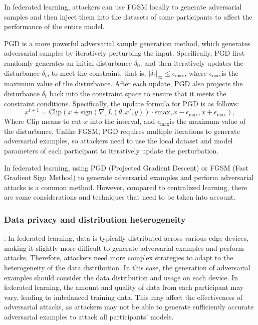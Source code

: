 \documentclass[conference]{IEEEtran}
\begin{document}
In federated learning, attackers can use FGSM locally to generate
adversarial samples and then inject them into the datasets of some participants
to affect the performance of the entire model.

PGD\cite{b100} is a more powerful adversarial sample generation method,
which generates adversarial samples by iteratively perturbing the input.
Specifically, PGD first randomly generates an initial disturbance $\delta_0$,
and then iteratively updates the disturbance $\delta_t$, to meet the constraint,
that is, $|\delta_t|_{\infty} \leq \epsilon_{\text{max}}$,
where $\epsilon_{\text{max}}$is the maximum value of the disturbance.
After each update, PGD also projects the disturbance
$\delta_t$ back into the constraint space to ensure that it meets the
constraint conditions.
Specifically, the update formula for PGD is as follows:
\begin{equation}
    x^{t+1} = \text{Clip}(x + \text{sign}(\nabla_x L(\theta,x',y)) \cdot \epsilon{\text{max}}, x - \epsilon_{\text{max}}, x + \epsilon_{\text{max}}),
\end{equation}
Where $\text{Clip}$ means to cut $x$ into the interval, and $\epsilon_ {\text{max}} $is the maximum value of the disturbance.
Unlike FGSM, PGD requires multiple iterations to generate adversarial examples,
so attackers need to use the local dataset and model parameters of each participant
to iteratively update the perturbation.

In federated learning, using PGD (Projected Gradient Descent) or FGSM
(Fast Gradient Sign Method) to generate adversarial examples and perform
adversarial attacks is a common method. However, compared to centralized
learning, there are some considerations and techniques that need to be
taken into account.

\subsubsection{Data privacy and distribution heterogeneity}: In federated learning, data is
typically distributed across various edge devices, making it slightly more
difficult to generate adversarial examples and perform attacks. Therefore,
attackers need more complex strategies to adapt to the heterogeneity of the
data distribution. In this case, the generation of adversarial examples should
consider the data distribution and usage on each device. In federated learning,
the amount and quality of data from each participant may vary, leading to
imbalanced training data. This may affect the effectiveness of adversarial attacks,
as attackers may not be able to generate sufficiently accurate adversarial
examples to attack all participants' models.
\end{document}
